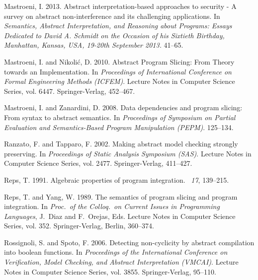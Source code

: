 \documentclass[prodmode,acmtocl]{acmsmall}
\newcommand{\0}{\mbox{\bf 0}}
\begin{document}
\begin{thebibliography}{}
{\sc Mastroeni, I.} 2013.
\newblock Abstract interpretation-based approaches to security - {A} survey on
  abstract non-interference and its challenging applications.
\newblock In {\em Semantics, Abstract Interpretation, and Reasoning about
  Programs: Essays Dedicated to David A. Schmidt on the Occasion of his
  Sixtieth Birthday, Manhattan, Kansas, USA, 19-20th September 2013.} 41--65.

{\sc Mastroeni, I.} {\sc and} {\sc Nikoli\'c, D.} 2010.
\newblock Abstract {P}rogram {S}licing: {F}rom {T}heory towards an
  {I}mplementation.
\newblock In {\em Proceedings of International Conference on Formal Engineering
  Methods (ICFEM)}. Lecture Notes in Computer Science Series, vol. 6447.
  Springer-Verlag, 452--467.

{\sc Mastroeni, I.} {\sc and} {\sc Zanardini, D.} 2008.
\newblock Data dependencies and program slicing: From syntax to abstract
  semantics.
\newblock In {\em Proceedings of Symposium on Partial Evaluation and
  Semantics-Based Program Manipulation (PEPM)}. 125--134.

{\sc Ranzato, F.} {\sc and} {\sc Tapparo, F.} 2002.
\newblock Making abstract model checking strongly preserving.
\newblock In {\em Proceedings of Static Analysis Symposium (SAS)}. Lecture
  Notes in Computer Science Series, vol. 2477. Springer-Verlag, 411--427.

{\sc Reps, T.} 1991.
\newblock Algebraic properties of program integration.
~{\em 17}, 139--215.

{\sc Reps, T.} {\sc and} {\sc Yang, W.} 1989.
\newblock The semantics of program slicing and program integration.
\newblock In {\em Proc.\ of the Colloq.\ on Current Issues in Programming
  Languages}, {J.~Diaz} {and} {F.~Orejas}, Eds. Lecture Notes in Computer
  Science Series, vol. 352. Springer-Verlag, Berlin, 360--374.

{\sc Rossignoli, S.} {\sc and} {\sc Spoto, F.} 2006.
\newblock Detecting non-cyclicity by abstract compilation into boolean
  functions.
\newblock In {\em Proceedings of the International Conference on Verification,
  Model Checking, and Abstract Interpretation (VMCAI)}. Lecture Notes in
  Computer Science Series, vol. 3855. Springer-Verlag, 95--110.


\end{thebibliography}
\end{document}
